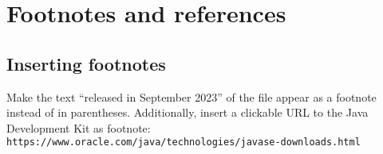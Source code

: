 \section{Footnotes and references}

\subsection{Inserting footnotes}

Make the text \enquote{released in September 2023} of the file  appear as a footnote instead of in parentheses. 
Additionally, insert a clickable URL to the Java Development Kit as footnote: \\ \texttt{https://www.oracle.com/java/technologies/javase-downloads.html}
